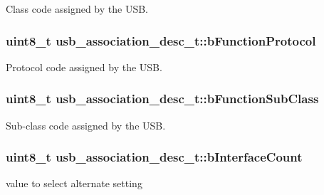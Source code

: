 \-Class code assigned by the \-U\-S\-B. 

\hypertarget{structusb__association__desc__t_a7e136eb3457b18de956967735b236783}{
\subsubsection[{b\-Function\-Protocol}]{\setlength{\rightskip}{0pt plus 5cm}uint8\-\_\-t {\bf usb\-\_\-association\-\_\-desc\-\_\-t\-::b\-Function\-Protocol}}}
\label{structusb__association__desc__t_a7e136eb3457b18de956967735b236783}


\-Protocol code assigned by the \-U\-S\-B. 

\hypertarget{structusb__association__desc__t_a4ab4cadd0f156f30edea9d4724501a06}{
\subsubsection[{b\-Function\-Sub\-Class}]{\setlength{\rightskip}{0pt plus 5cm}uint8\-\_\-t {\bf usb\-\_\-association\-\_\-desc\-\_\-t\-::b\-Function\-Sub\-Class}}}
\label{structusb__association__desc__t_a4ab4cadd0f156f30edea9d4724501a06}


\-Sub-\/class code assigned by the \-U\-S\-B. 

\hypertarget{structusb__association__desc__t_a3fa0288c02ae9c72411f564ecf427c5b}{
\subsubsection[{b\-Interface\-Count}]{\setlength{\rightskip}{0pt plus 5cm}uint8\-\_\-t {\bf usb\-\_\-association\-\_\-desc\-\_\-t\-::b\-Interface\-Count}}}
\label{structusb__association__desc__t_a3fa0288c02ae9c72411f564ecf427c5b}


value to select alternate setting 

